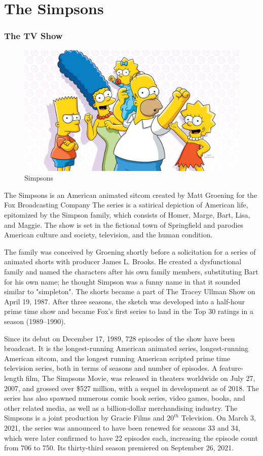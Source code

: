 \section{The Simpsons} \label{P2}
\subsubsection*{The TV Show}
\begin{figure}[!htb]
    \centering
    \includegraphics[width=0.95\linewidth]{Resources/simpson.jpg}
    \caption{Simpsons}
    \label{fig:P1Q3b}
\end{figure}

The Simpsons is an American animated sitcom created by Matt Groening for the Fox Broadcasting Company The series is a satirical depiction of American life, epitomized by the Simpson family, which consists of Homer, Marge, Bart, Lisa, and Maggie. The show is set in the fictional town of Springfield and parodies American culture and society, television, and the human condition.

The family was conceived by Groening shortly before a solicitation for a series of animated shorts with producer James L. Brooks. He created a dysfunctional family and named the characters after his own family members, substituting Bart for his own name; he thought Simpson was a funny name in that it sounded similar to "simpleton". The shorts became a part of The Tracey Ullman Show on April 19, 1987. After three seasons, the sketch was developed into a half-hour prime time show and became Fox's first series to land in the Top 30 ratings in a season (1989–1990).

Since its debut on December 17, 1989, 728 episodes of the show have been broadcast. It is the longest-running American animated series, longest-running American sitcom, and the longest running American scripted prime time television series, both in terms of seasons and number of episodes. A feature-length film, The Simpsons Movie, was released in theaters worldwide on July 27, 2007, and grossed over \$527 million, with a sequel in development as of 2018. The series has also spawned numerous comic book series, video games, books, and other related media, as well as a billion-dollar merchandising industry. The Simpsons is a joint production by Gracie Films and $20^{th}$ Television. On March 3, 2021, the series was announced to have been renewed for seasons 33 and 34, which were later confirmed to have 22 episodes each, increasing the episode count from 706 to 750. Its thirty-third season premiered on September 26, 2021.

